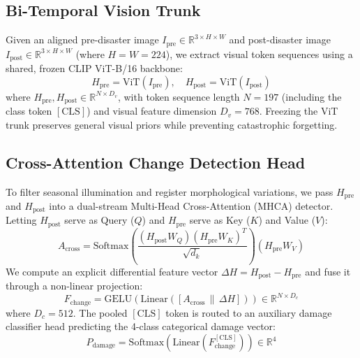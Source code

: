 \documentclass[conference]{IEEEtran}
\begin{document}
\subsection{Bi-Temporal Vision Trunk}
Given an aligned pre-disaster image $I_{\text{pre}} \in \mathbb{R}^{3 \times H \times W}$ and post-disaster image $I_{\text{post}} \in \mathbb{R}^{3 \times H \times W}$ (where $H=W=224$), we extract visual token sequences using a shared, frozen CLIP ViT-B/16 backbone:
\begin{equation}
H_{\text{pre}} = \text{ViT}(I_{\text{pre}}), \quad H_{\text{post}} = \text{ViT}(I_{\text{post}})
\end{equation}
where $H_{\text{pre}}, H_{\text{post}} \in \mathbb{R}^{N \times D_v}$, with token sequence length $N = 197$ (including the class token $[\text{CLS}]$) and visual feature dimension $D_v = 768$. Freezing the ViT trunk preserves general visual priors while preventing catastrophic forgetting.

\subsection{Cross-Attention Change Detection Head}
To filter seasonal illumination and register morphological variations, we pass $H_{\text{pre}}$ and $H_{\text{post}}$ into a dual-stream Multi-Head Cross-Attention (MHCA) detector. Letting $H_{\text{post}}$ serve as Query ($Q$) and $H_{\text{pre}}$ serve as Key ($K$) and Value ($V$):
\begin{equation}
A_{\text{cross}} = \text{Softmax}\left(\frac{(H_{\text{post}} W_Q)(H_{\text{pre}} W_K)^T}{\sqrt{d_k}}\right) (H_{\text{pre}} W_V)
\end{equation}
We compute an explicit differential feature vector $\Delta H = H_{\text{post}} - H_{\text{pre}}$ and fuse it through a non-linear projection:
\begin{equation}
F_{\text{change}} = \text{GELU}\left(\text{Linear}\left([A_{\text{cross}} \,\|\, \Delta H]\right)\right) \in \mathbb{R}^{N \times D_c}
\end{equation}
where $D_c = 512$. The pooled $[\text{CLS}]$ token is routed to an auxiliary damage classifier head predicting the 4-class categorical damage vector:
\begin{equation}
\hat{P}_{\text{damage}} = \text{Softmax}\left(\text{Linear}(F_{\text{change}}^{[\text{CLS}]})\right) \in \mathbb{R}^4
\end{equation}
\end{document}
